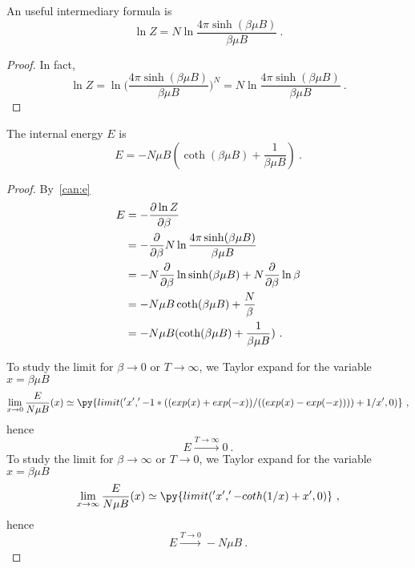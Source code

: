     An useful intermediary formula is 
    \begin{equation*}
        \ln Z = N \ln \frac{4 \pi \sinh (\beta \mu B)}{\beta \mu B}  ~.
    \end{equation*}
    \begin{proof}
        In fact,
        \begin{equation*}
            \ln Z = \ln \Big (\frac{4 \pi \sinh (\beta \mu B)}{\beta \mu B} \Big )^N = N \ln \frac{4 \pi \sinh (\beta \mu B)}{\beta \mu B}  ~.
        \end{equation*}
    \end{proof}
    
    The internal energy $E$ is 
    \begin{equation*}
        E = - N \mu B (\coth (\beta \mu B) + \frac{1}{\beta \mu B} ) ~.
    \end{equation*}
    \begin{proof}
        By~\eqref{can:e}
        \begin{equation*}
        \begin{aligned}
            E & = - \frac{\partial\ln Z}{\partial\beta} \\ & = - \frac{\partial}{\partial\beta} N \ln \frac{4 \pi \sinh (\beta \mu B)}{\beta \mu B} \\ & = - N \frac{\partial}{\partial\beta} \ln \sinh (\beta \mu B) + N \frac{\partial}{\partial\beta} \ln \beta \\ & = - N \mu B \coth (\beta \mu B) + \frac{N}{\beta} \\ & = - N \mu B (\coth (\beta \mu B) + \frac{1}{\beta \mu B} ) ~.
        \end{aligned}
        \end{equation*}

        To study the limit for $\beta \rightarrow 0$ or $T \rightarrow \infty$, we Taylor expand for the variable $x = \beta \mu B$
        \begin{equation*}
            \lim_{x \rightarrow 0} \frac{E}{N \mu B} (x) \simeq \py{limit('x', '- 1 * ((exp(x) + exp(-x))/((exp(x) - exp(-x)))) + 1 / x', 0)} ~,
        \end{equation*}
        hence 
        \begin{equation*}
            E \xrightarrow{T \rightarrow \infty} 0 ~.
        \end{equation*}
        To study the limit for $\beta \rightarrow \infty$ or $T \rightarrow 0$, we Taylor expand for the variable $x = \beta \mu B$
        \begin{equation*}
            \lim_{x \rightarrow \infty} \frac{E}{N \mu B} (x) \simeq \py{limit('x', '- coth(1 / x) + x', 0)} ~,
        \end{equation*}
        hence 
        \begin{equation*}
            E \xrightarrow{T \rightarrow 0} - N \mu B ~.
        \end{equation*}
    \end{proof}
